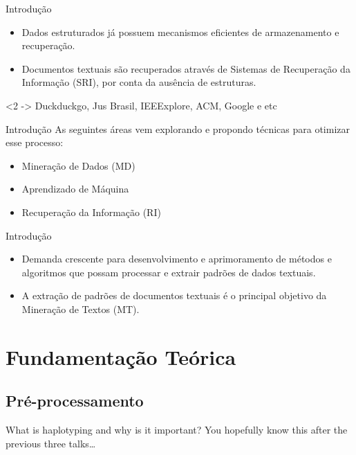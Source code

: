 \documentclass[brazil]{beamer}
\begin{document}
\begin{frame}{Introdução}
  \begin{itemize}
    \item<1 -> Dados estruturados já possuem mecanismos eficientes de armazenamento e recuperação.
    \item<2 -> \alert{Documentos textuais} são recuperados através de Sistemas de Recuperação da
      Informação (SRI), por conta da \alert{ausência de estruturas}. 
  \end{itemize}
  \begin{examples}<2 ->
    Duckduckgo, Jus Brasil, IEEExplore, ACM, Google e etc 
  \end{examples}
\end{frame}

\begin{frame}{Introdução}
  As seguintes áreas vem explorando e propondo técnicas para otimizar esse processo: 
  \begin{itemize}
    \item Mineração de Dados (MD) 
    \item Aprendizado de Máquina  
    \item Recuperação da Informação (RI)
  \end{itemize}
\end{frame}

\begin{frame}{Introdução}
  \begin{itemize}
    \item Demanda crescente para desenvolvimento e aprimoramento de métodos e algoritmos que possam
      processar e \alert{extrair padrões} de \alert{dados textuais}. 
    \item A extração de padrões de documentos textuais é o principal objetivo da Mineração de Textos
      (MT).
  \end{itemize}
\end{frame}

\section{Fundamentação Teórica}

\subsection{Pré-processamento}
\begin{frame}{What is haplotyping and why is it important?}
  You hopefully know this after the previous three talks\dots
\end{frame}
\end{document}
